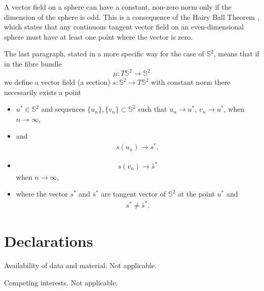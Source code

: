 \documentclass[12pt]{amsart}
\begin{document}
A vector field on a sphere can have a constant, non-zero norm only if the dimension of the sphere is odd. This is a consequence of the Hairy Ball Theorem \cite{Eisenberg}, which states that any continuous tangent vector field on an even-dimensional sphere must have at least one point where the vector is zero.  
 
The last paragraph, stated in a more specific way for the case of $\mathbb{S}^2$, means that if in the fibre bundle
 $$
\mu: T\mathbb{S}^2 \rightarrow \mathbb{S}^2
$$ 
we define a vector field (a section) $s: \mathbb{S}^2 \rightarrow T\mathbb{S}^2 $ with constant norm there necessarily exists a point
\begin{itemize}
\item [i')] $u^* \in \mathbb{S}^2$ and sequences $\{u_n\}, \{v_n\}\subset \mathbb{S}^2$    such that $u_n\rightarrow u^*$, $v_n\rightarrow u^*$,
when $n \rightarrow \infty$, 
\item [ii')]  and  
\begin{eqnarray}\label{pedro}
s(u_n) \rightarrow s^*,
\end{eqnarray}
 \item [iii')]  
\begin{eqnarray}\label{infante}
s(v_n) \rightarrow \bar{s}^*
\end{eqnarray} 
when $n\rightarrow \infty$,  
\item [iv')] where the vector $s^*$ and $\bar{s}^*$ are tangent vector of $\mathbb{S}^2$ at the point $u^*$ and 
\begin{eqnarray}\label{negrete}
s^*\not=\bar{s}^*.
\end{eqnarray} 
\end{itemize}




\section{Declarations}
Availability of data and material. 
Not applicable. 

Competing interests. 
Not applicable. 
\end{document}
